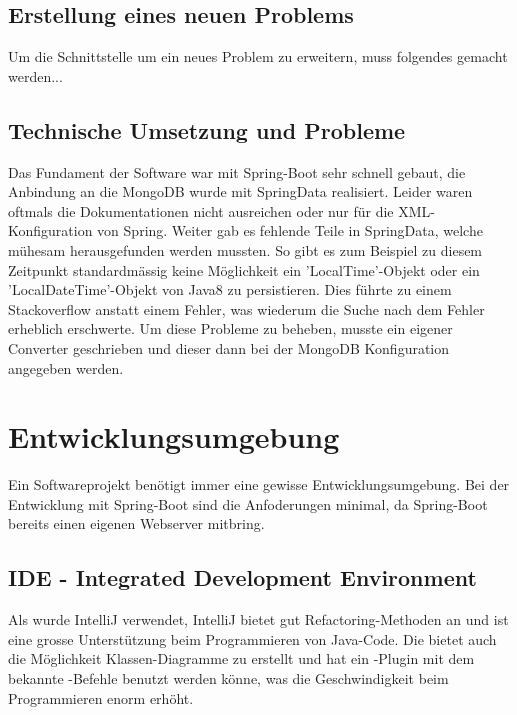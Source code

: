 \FloatBarrier

\subsection{Erstellung eines neuen Problems}
Um die Schnittstelle um ein neues Problem zu erweitern, muss folgendes gemacht werden...


\FloatBarrier

\subsection{Technische Umsetzung und Probleme}
Das Fundament der Software war mit Spring-Boot \cite{spring_boot} sehr schnell gebaut, die Anbindung an die MongoDB wurde mit SpringData \cite{spring_data} realisiert. Leider waren 
oftmals die Dokumentationen nicht ausreichen oder nur für die XML-Konfiguration von Spring. Weiter gab es fehlende Teile in SpringData, welche mühesam herausgefunden werden mussten. 
So gibt es zum Beispiel zu diesem Zeitpunkt standardmässig keine Möglichkeit ein 'LocalTime'-Objekt oder ein 'LocalDateTime'-Objekt von Java8 zu persistieren. Dies führte zu einem 
Stackoverflow anstatt einem Fehler, was wiederum die Suche nach dem Fehler erheblich erschwerte. Um diese Probleme zu beheben, musste ein eigener Converter geschrieben und dieser 
dann bei der MongoDB Konfiguration angegeben werden.

\newpage

\section{Entwicklungsumgebung}\label{entwicklungsumgebung}
Ein Softwareprojekt benötigt immer eine gewisse Entwicklungsumgebung. Bei der Entwicklung mit Spring-Boot sind die Anfoderungen minimal, da Spring-Boot bereits einen eigenen Webserver 
mitbring.

\subsection{IDE - Integrated Development Environment}
Als  wurde IntelliJ verwendet, IntelliJ bietet gut Refactoring-Methoden an und ist eine grosse Unterstützung beim Programmieren von Java-Code. Die  
bietet auch die Möglichkeit Klassen-Diagramme zu erstellt und hat ein -Plugin mit dem bekannte -Befehle benutzt werden könne, was die 
Geschwindigkeit beim Programmieren enorm erhöht.

